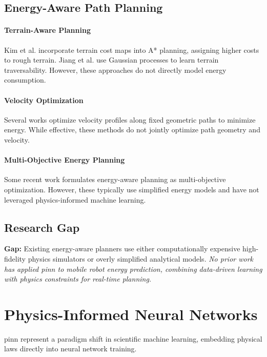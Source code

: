 \subsection{Energy-Aware Path Planning}

\paragraph{Terrain-Aware Planning}
Kim et al. \cite{Kim2012} incorporate terrain cost maps into A* planning, assigning higher costs to rough terrain. Jiang et al. \cite{Jiang2017} use Gaussian processes to learn terrain traversability. However, these approaches do not directly model energy consumption.

\paragraph{Velocity Optimization}
Several works \cite{Suzuki2013,Liu2017} optimize velocity profiles along fixed geometric paths to minimize energy. While effective, these methods do not jointly optimize path geometry and velocity.

\paragraph{Multi-Objective Energy Planning}
Some recent work \cite{Castillo2019,Wang2020} formulates energy-aware planning as multi-objective optimization. However, these typically use simplified energy models and have not leveraged physics-informed machine learning.

\subsection{Research Gap}
\textbf{Gap:} Existing energy-aware planners use either computationally expensive high-fidelity physics simulators or overly simplified analytical models. \textit{No prior work has applied \acrshort{pinn} to mobile robot energy prediction, combining data-driven learning with physics constraints for real-time planning.}

\section{Physics-Informed Neural Networks}
\label{sec:lit_pinn}

\acrfull{pinn} represent a paradigm shift in scientific machine learning, embedding physical laws directly into neural network training.

